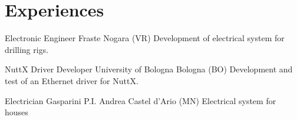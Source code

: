 \section{Experiences}

        {Electronic Engineer}
        {Fraste}
        {Nogara (VR)}{}
        {Development of electrical system for drilling rigs.}

\vspace{2mm}

        {NuttX Driver Developer}
        {University of Bologna}
        {Bologna (BO)}{}
        {Development and test of an Ethernet driver for NuttX.}

\vspace{2mm}

        {Electrician}
        {Gasparini P.I. Andrea}
        {Castel d'Ario (MN)}{}
        {Electrical system for houses}
